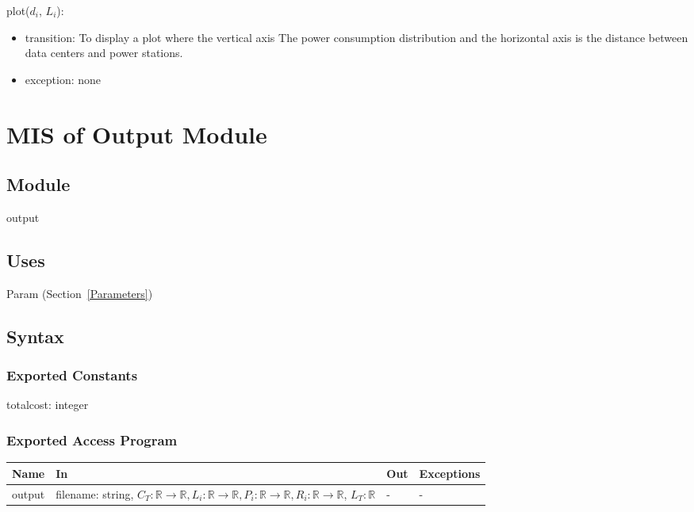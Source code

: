 \documentclass[12pt, titlepage]{article}
\begin{document}
\noindent plot($d_i$, $L_i$):
\begin{itemize}
\item transition: To display a plot where the vertical axis
  The power consumption distribution and the horizontal axis is the distance between data centers and power stations.  
\item exception: none
\end{itemize}

\newpage

\section{MIS of Output Module} \label{Output}

\subsection{Module}

output

\subsection{Uses}

Param (Section~\ref{Parameters})

\subsection{Syntax}

\subsubsection{Exported Constants}

totalcost: integer

\subsubsection{Exported Access Program}

\begin{center}
\begin{tabular}{p{3cm} p{7cm} p{2cm} p{2cm}}
\hline
\textbf{Name} & \textbf{In} & \textbf{Out} & \textbf{Exceptions} \\
\hline
output & filename: string, $C_T:\mathbb{R} \rightarrow \mathbb{R},
                 L_i:\mathbb{R} \rightarrow \mathbb{R},
                 P_i:\mathbb{R} \rightarrow \mathbb{R},
       R_i:\mathbb{R} \rightarrow \mathbb{R}$, $L_T: \mathbb{R}$ & - & - \\
\hline
\end{tabular}
\end{center}
\end{document}
